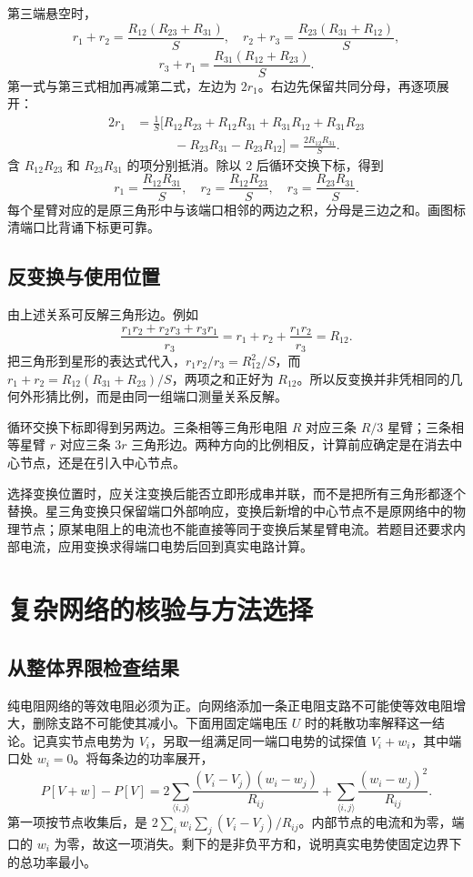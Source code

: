 第三端悬空时，
\[
 r_1+r_2=\frac{R_{12}(R_{23}+R_{31})}{S},\quad
 r_2+r_3=\frac{R_{23}(R_{31}+R_{12})}{S},
\]
\[
 r_3+r_1=\frac{R_{31}(R_{12}+R_{23})}{S}.
\]
第一式与第三式相加再减第二式，左边为 $2r_1$。右边先保留共同分母，再逐项展开：
\[
 \begin{aligned}
 2r_1&=\frac1S\bigl[R_{12}R_{23}+R_{12}R_{31}
 +R_{31}R_{12}+R_{31}R_{23}\\
 &\hspace{3em}-R_{23}R_{31}-R_{23}R_{12}\bigr]
 =\frac{2R_{12}R_{31}}S.
 \end{aligned}
\]
含 $R_{12}R_{23}$ 和 $R_{23}R_{31}$ 的项分别抵消。除以 $2$ 后循环交换下标，得到
\[
 r_1=\frac{R_{12}R_{31}}{S},\quad
 r_2=\frac{R_{12}R_{23}}{S},\quad
 r_3=\frac{R_{23}R_{31}}{S}.
\]
每个星臂对应的是原三角形中与该端口相邻的两边之积，分母是三边之和。画图标清端口比背诵下标更可靠。

\subsection{反变换与使用位置}

由上述关系可反解三角形边。例如
\[
 \frac{r_1r_2+r_2r_3+r_3r_1}{r_3}
 =r_1+r_2+\frac{r_1r_2}{r_3}=R_{12}.
\]
把三角形到星形的表达式代入，$r_1r_2/r_3=R_{12}^2/S$，而 $r_1+r_2=R_{12}(R_{31}+R_{23})/S$，两项之和正好为 $R_{12}$。所以反变换并非凭相同的几何外形猜比例，而是由同一组端口测量关系反解。

循环交换下标即得到另两边。三条相等三角形电阻 $R$ 对应三条 $R/3$ 星臂；三条相等星臂 $r$ 对应三条 $3r$ 三角形边。两种方向的比例相反，计算前应确定是在消去中心节点，还是在引入中心节点。

选择变换位置时，应关注变换后能否立即形成串并联，而不是把所有三角形都逐个替换。星三角变换只保留端口外部响应，变换后新增的中心节点不是原网络中的物理节点；原某电阻上的电流也不能直接等同于变换后某星臂电流。若题目还要求内部电流，应用变换求得端口电势后回到真实电路计算。


\section{复杂网络的核验与方法选择}
\subsection{从整体界限检查结果}

纯电阻网络的等效电阻必须为正。向网络添加一条正电阻支路不可能使等效电阻增大，删除支路不可能使其减小。下面用固定端电压 $U$ 时的耗散功率解释这一结论。记真实节点电势为 $V_i$，另取一组满足同一端口电势的试探值 $V_i+w_i$，其中端口处 $w_i=0$。将每条边的功率展开，
\[
 P[V+w]-P[V]
 =2\sum_{\langle i,j\rangle}\frac{(V_i-V_j)(w_i-w_j)}{R_{ij}}
  +\sum_{\langle i,j\rangle}\frac{(w_i-w_j)^2}{R_{ij}}.
\]
第一项按节点收集后，是 $2\sum_i w_i\sum_j(V_i-V_j)/R_{ij}$。内部节点的电流和为零，端口的 $w_i$ 为零，故这一项消失。剩下的是非负平方和，说明真实电势使固定边界下的总功率最小。


